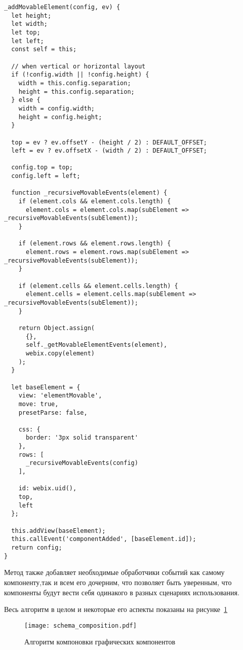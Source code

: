 \begin{lstlisting}
_addMovableElement(config, ev) {
  let height;
  let width;
  let top;
  let left;
  const self = this;

  // when vertical or horizontal layout
  if (!config.width || !config.height) {
    width = this.config.separation;
    height = this.config.separation;
  } else {
    width = config.width;
    height = config.height;
  }

  top = ev ? ev.offsetY - (height / 2) : DEFAULT_OFFSET;
  left = ev ? ev.offsetX - (width / 2) : DEFAULT_OFFSET;

  config.top = top;
  config.left = left;

  function _recursiveMovableEvents(element) {
    if (element.cols && element.cols.length) {
      element.cols = element.cols.map(subElement => _recursiveMovableEvents(subElement));
    }

    if (element.rows && element.rows.length) {
      element.rows = element.rows.map(subElement => _recursiveMovableEvents(subElement));
    }

    if (element.cells && element.cells.length) {
      element.cells = element.cells.map(subElement => _recursiveMovableEvents(subElement));
    }

    return Object.assign(
      {},
      self._getMovableElementEvents(element),
      webix.copy(element)
    );
  }

  let baseElement = {
    view: 'elementMovable',
    move: true,
    presetParse: false,

    css: {
      border: '3px solid transparent'
    },
    rows: [
      _recursiveMovableEvents(config)
    ],

    id: webix.uid(),
    top,
    left
  };

  this.addView(baseElement);
  this.callEvent('componentAdded', [baseElement.id]);
  return config;
}
\end{lstlisting}

Метод также добавляет необходимые обработчики событий как самому компоненту,так и всем его дочерним, что позволяет быть уверенным, что компоненты будут вести себя одинакого в разных сценариях использования.

Весь алгоритм в целом и некоторые его аспекты показаны на рисунке~\ref{sec:dev:composition}\pagebreak

\begin{figure}[ht]
  \centering
    \texttt{[image: schema\_composition.pdf]}
    \caption{Алгоритм компоновки графических компонентов}
    \label{sec:dev:composition}
\end{figure}